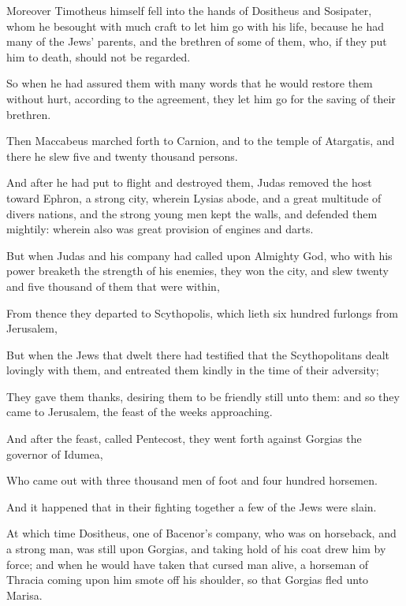 {\par }{\PP {}Moreover Timotheus himself fell into the hands of Dositheus and Sosipater, whom he besought with much craft to let him go with his life, because he had many of the Jews’ parents, and the brethren of some of them, who, if they put him to death, should not be regarded.
\par }{\PP {}So when he had assured them with many words that he would restore them without hurt, according to the agreement, they let him go for the saving of their brethren.
\par }{\PP {}Then Maccabeus marched forth to Carnion, and to the temple of Atargatis, and there he slew five and twenty thousand persons.
\par }{\PP {}And after he had put to flight and destroyed them, Judas removed the host toward Ephron, a strong city, wherein Lysias abode, and a great multitude of divers nations, and the strong young men kept the walls, and defended them mightily: wherein also was great provision of engines and darts.
\par }{\PP {}But when Judas and his company had called upon Almighty God, who with his power breaketh the strength of his enemies, they won the city, and slew twenty and five thousand of them that were within,
\par }{\PP {}From thence they departed to Scythopolis, which lieth six hundred furlongs from Jerusalem,
\par }{\PP {}But when the Jews that dwelt there had testified that the Scythopolitans dealt lovingly with them, and entreated them kindly in the time of their adversity;
\par }{\PP {}They gave them thanks, desiring them to be friendly still unto them: and so they came to Jerusalem, the feast of the weeks approaching.
\par }{\PP {}And after the feast, called Pentecost, they went forth against Gorgias the governor of Idumea,
\par }{\PP {}Who came out with three thousand men of foot and four hundred horsemen.
\par }{\PP {}And it happened that in their fighting together a few of the Jews were slain.
\par }{\PP {}At which time Dositheus, one of Bacenor’s company, who was on horseback, and a strong man, was still upon Gorgias, and taking hold of his coat drew him by force; and when he would have taken that cursed man alive, a horseman of Thracia coming upon him smote off his shoulder, so that Gorgias fled unto Marisa.
}
